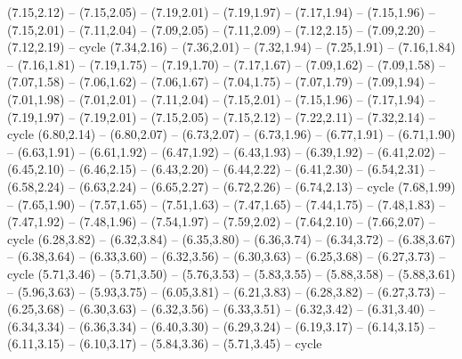 \expandafter\def\csname geo:gebiet:MWI\endcsname{
  (7.15,2.12) -- (7.15,2.05) -- (7.19,2.01) -- (7.19,1.97) -- (7.17,1.94) -- (7.15,1.96) -- (7.15,2.01) -- (7.11,2.04) -- (7.09,2.05) -- (7.11,2.09) -- (7.12,2.15) -- (7.09,2.20) -- (7.12,2.19) -- cycle}
\expandafter\def\csname geo:gebiet:MOZ\endcsname{
  (7.34,2.16) -- (7.36,2.01) -- (7.32,1.94) -- (7.25,1.91) -- (7.16,1.84) -- (7.16,1.81) -- (7.19,1.75) -- (7.19,1.70) -- (7.17,1.67) -- (7.09,1.62) -- (7.09,1.58) -- (7.07,1.58) -- (7.06,1.62) -- (7.06,1.67) -- (7.04,1.75) -- (7.07,1.79) -- (7.09,1.94) -- (7.01,1.98) -- (7.01,2.01) -- (7.11,2.04) -- (7.15,2.01) -- (7.15,1.96) -- (7.17,1.94) -- (7.19,1.97) -- (7.19,2.01) -- (7.15,2.05) -- (7.15,2.12) -- (7.22,2.11) -- (7.32,2.14) -- cycle}
\expandafter\def\csname geo:gebiet:SWZ\endcsname{
  }
\expandafter\def\csname geo:gebiet:AGO\endcsname{
  (6.80,2.14) -- (6.80,2.07) -- (6.73,2.07) -- (6.73,1.96) -- (6.77,1.91) -- (6.71,1.90) -- (6.63,1.91) -- (6.61,1.92) -- (6.47,1.92) -- (6.43,1.93) -- (6.39,1.92) -- (6.41,2.02) -- (6.45,2.10) -- (6.46,2.15) -- (6.43,2.20) -- (6.44,2.22) -- (6.41,2.30) -- (6.54,2.31) -- (6.58,2.24) -- (6.63,2.24) -- (6.65,2.27) -- (6.72,2.26) -- (6.74,2.13) -- cycle}
\expandafter\def\csname geo:gebiet:BDI\endcsname{
  }
\expandafter\def\csname geo:gebiet:ISR\endcsname{
  }
\expandafter\def\csname geo:gebiet:LBN\endcsname{
  }
\expandafter\def\csname geo:gebiet:MDG\endcsname{
  (7.68,1.99) -- (7.65,1.90) -- (7.57,1.65) -- (7.51,1.63) -- (7.47,1.65) -- (7.44,1.75) -- (7.48,1.83) -- (7.47,1.92) -- (7.48,1.96) -- (7.54,1.97) -- (7.59,2.02) -- (7.64,2.10) -- (7.66,2.07) -- cycle}
\expandafter\def\csname geo:gebiet:PSX\endcsname{
  }
\expandafter\def\csname geo:gebiet:GMB\endcsname{
  }
\expandafter\def\csname geo:gebiet:TUN\endcsname{
  (6.28,3.82) -- (6.32,3.84) -- (6.35,3.80) -- (6.36,3.74) -- (6.34,3.72) -- (6.38,3.67) -- (6.38,3.64) -- (6.33,3.60) -- (6.32,3.56) -- (6.30,3.63) -- (6.25,3.68) -- (6.27,3.73) -- cycle}
\expandafter\def\csname geo:gebiet:DZA\endcsname{
  (5.71,3.46) -- (5.71,3.50) -- (5.76,3.53) -- (5.83,3.55) -- (5.88,3.58) -- (5.88,3.61) -- (5.96,3.63) -- (5.93,3.75) -- (6.05,3.81) -- (6.21,3.83) -- (6.28,3.82) -- (6.27,3.73) -- (6.25,3.68) -- (6.30,3.63) -- (6.32,3.56) -- (6.33,3.51) -- (6.32,3.42) -- (6.31,3.40) -- (6.34,3.34) -- (6.36,3.34) -- (6.40,3.30) -- (6.29,3.24) -- (6.19,3.17) -- (6.14,3.15) -- (6.11,3.15) -- (6.10,3.17) -- (5.84,3.36) -- (5.71,3.45) -- cycle}
